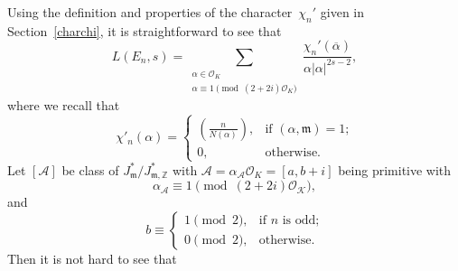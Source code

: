 \documentclass[11pt, reqno]{amsart}
\theoremstyle{plain}
\theoremstyle{definition}
\numberwithin{equation}{section}
\begin{document}
Using the definition and properties of the character~$\chi_{n}'$ given in Section~\ref{charchi}, it is straightforward to see that
$$
L(E_{n},s)=\sum_{\substack{\alpha\in\mathcal{O}_{K}\\\alpha\equiv1\pmod{(2+2i)\mathcal{O}_{K}}}}\frac{\chi_n'(\overline{\alpha})}{\alpha|\alpha|^{2s-2}},
$$
where we recall that
$$
\chi'_{n}(\alpha)=
\begin{cases}
    \left(\frac{n}{N(\alpha)}\right),& \mbox{if $(\alpha,\mathfrak{m})=1$;}\\
    0,&\mbox{otherwise.}
\end{cases}
 $$
Let $[\mathcal{A}]$ be class of $J_{\mathfrak{m}}^{*}/J_{\mathfrak{m},\mathbb{Z}}^{*}$ with $\mathcal{A}=\alpha_{\mathcal{A}}\mathcal{O}_{K}=[a,{b+i}{}]$ being primitive with $$\alpha_{\mathcal{A}}\equiv 1\pmod{(2+2i)\mathcal{O_{K}}},$$  
and 
$$
b\equiv \begin{cases}
    1\pmod{2},&\mbox{if $n$ is odd;}\\
    0\pmod{2},&\mbox{otherwise.}
\end{cases}
$$
 Then it is not hard to see that
\end{document}
